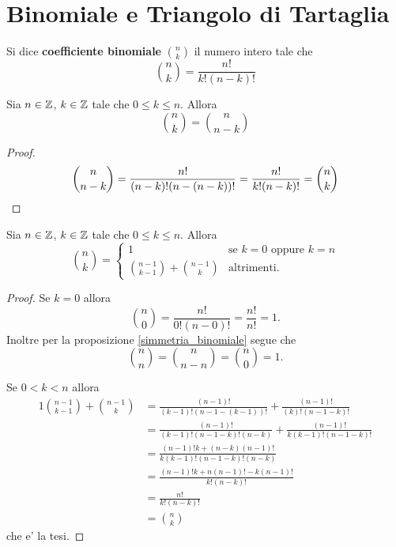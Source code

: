 \section{Binomiale e Triangolo di Tartaglia}

\begin{definition}
    Si dice \textbf{coefficiente binomiale} $\binom{n}{k}$ il numero intero tale che \begin{equation}
        \binom{n}{k} = \frac{n!}{k!(n-k)!}
    \end{equation}    
\end{definition}

\begin{proposition}\label{simmetria_binomiale}
    Sia $n \in \mathbb{Z}$, $k \in \mathbb{Z}$ tale che $0 \leq k \leq n$. Allora \begin{equation}
        \binom{n}{k} = \binom{n}{n-k}
    \end{equation}
\end{proposition}
\begin{proof}
    \[\binom{n}{n - k} = \frac{n!}{(n-k)!(n-(n-k))!} = \frac{n!}{k!(n-k)!} = \binom{n}{k} \qedhere\]
\end{proof}

\begin{proposition} \label{binomiale_ricorsivo}
    Sia $n \in \mathbb{Z}$, $k \in \mathbb{Z}$ tale che $0 \leq k \leq n$. Allora \begin{equation}
        \binom{n}{k} = \begin{cases}
            1 &\text{se } k = 0 \text{ oppure } k = n \\
            \binom{n - 1}{k - 1} + \binom{n - 1}{k} &\text{altrimenti}.
        \end{cases}
    \end{equation}
\end{proposition}
\begin{proof}
    Se $k = 0$ allora \[\binom{n}{0} = \frac{n!}{0!(n-0)!} = \frac{n!}{n!} = 1.\] 
    Inoltre per la proposizione \ref{simmetria_binomiale} segue che \[\binom{n}{n} = \binom{n}{n - n} = \binom{n}{0} = 1.\]

    Se $0 < k < n$ allora \begin{alignat*}
        {1}
        \binom{n - 1}{k - 1} + \binom{n - 1}{k} &= \frac{(n-1)!}{(k-1)!(n-1-(k-1))!} + \frac{(n-1)!}{(k)!(n-1-k)!} \\[1em]
        &= \frac{(n-1)!}{(k-1)!(n-1-k)!(n-k)} + \frac{(n-1)!}{k(k-1)!(n-1-k)!} \\[1em]
        &= \frac{(n-1)!k + (n-k)(n-1)!}{k(k-1)!(n-1-k)!(n-k)} \\[1em]
        &= \frac{(n-1)!k + n(n-1)! - k(n-1)!}{k!(n-k)!} \\
        &= \frac{n!}{k!(n-k)!} \\[1em]
        &= \binom{n}{k}
    \end{alignat*}
    che e' la tesi.
\end{proof}


